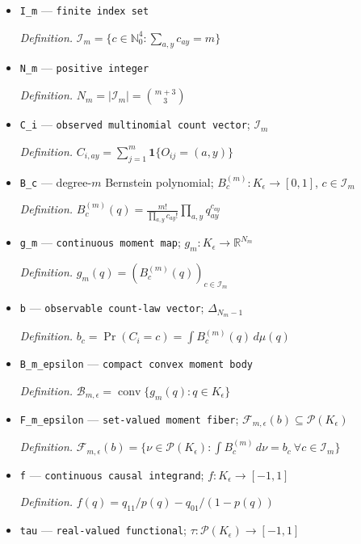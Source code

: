 \documentclass{article}
\begin{document}
\begin{itemize}
  \item \texttt{I\_\allowbreak{}m} --- \texttt{finite index set}
  \par\smallskip\noindent\emph{Definition.} \(\mathcal I_m=\{c\in\mathbb N_0^4:\sum_{a,y}c_{ay}=m\}\)
  \item \texttt{N\_\allowbreak{}m} --- \texttt{positive integer}
  \par\smallskip\noindent\emph{Definition.} \(N_m=|\mathcal I_m|={m+3\choose3}\)
  \item \texttt{C\_\allowbreak{}i} --- \texttt{observed multinomial count vector}; \(\mathcal I_m\)
  \par\smallskip\noindent\emph{Definition.} \(C_{i,ay}=\sum_{j=1}^m\mathbf 1\{O_{ij}=(a,y)\}\)
  \item \texttt{B\_\allowbreak{}c} --- degree-\(m\) Bernstein polynomial; \(B_c^{(m)}:K_{\epsilon}\to[0,1]\), \(c\in\mathcal I_m\)
  \par\smallskip\noindent\emph{Definition.} \(B_c^{(m)}(q)=\frac{m!}{\prod_{a,y}c_{ay}!}\prod_{a,y}q_{ay}^{c_{ay}}\)
  \item \texttt{g\_\allowbreak{}m} --- \texttt{continuous moment map}; \(g_m:K_{\epsilon}\to\mathbb R^{N_m}\)
  \par\smallskip\noindent\emph{Definition.} \(g_m(q)=(B_c^{(m)}(q))_{c\in\mathcal I_m}\)
  \item \texttt{b} --- \texttt{observable count-\allowbreak{}law vector}; \(\Delta_{N_m-1}\)
  \par\smallskip\noindent\emph{Definition.} \(b_c=\Pr(C_i=c)=\int B_c^{(m)}(q)\,d\mu(q)\)
  \item \texttt{B\_\allowbreak{}m\_\allowbreak{}epsilon} --- \texttt{compact convex moment body}
  \par\smallskip\noindent\emph{Definition.} \(\mathcal B_{m,\epsilon}=\operatorname{conv}\{g_m(q):q\in K_{\epsilon}\}\)
  \item \texttt{F\_\allowbreak{}m\_\allowbreak{}epsilon} --- \texttt{set-\allowbreak{}valued moment fiber}; \(\mathcal F_{m,\epsilon}(b)\subseteq\mathcal P(K_{\epsilon})\)
  \par\smallskip\noindent\emph{Definition.} \(\mathcal F_{m,\epsilon}(b)=\{\nu\in\mathcal P(K_{\epsilon}):\int B_c^{(m)}\,d\nu=b_c\ \forall c\in\mathcal I_m\}\)
  \item \texttt{f} --- \texttt{continuous causal integrand}; \(f:K_{\epsilon}\to[-1,1]\)
  \par\smallskip\noindent\emph{Definition.} \(f(q)=q_{11}/p(q)-q_{01}/(1-p(q))\)
  \item \texttt{tau} --- \texttt{real-\allowbreak{}valued functional}; \(\tau:\mathcal P(K_{\epsilon})\to[-1,1]\)

\end{itemize}
\end{document}

